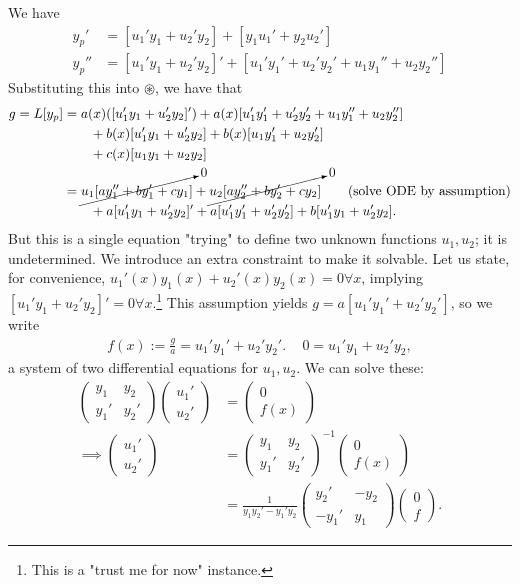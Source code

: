 We have
\begin{align*}
    y_p' &= [u_1'y_1+u_2'y_2]+[y_1u_1'+y_2u_2']\\
    y_p''&=[u_1'y_1+u_2'y_2]'+[u_1'y_1'+u_2'y_2'+u_1y_1''+u_2y_2'']
\end{align*}
Substituting this into $\circledast$, we have that \begin{align*}
    g = L[y_p] &= a(x)([u_1'y_1+u_2'y_2]')+a(x)[u_1'y_1'+u_2'y_2'+u_1y_1''+u_2y_2'']\\
    & \qquad + b(x)[u_1'y_1+u_2'y_2]+b(x)[u_1y_1'+u_2y_2']\\
    & \qquad + c(x)[u_1y_1+u_2y_2]\\
    &=\cancelto{0}{u_1[ay_1''+by_1'+cy_1]}+\cancelto{0}{u_2[ay_2''+by_2'+cy_2]} \qquad \text{(solve ODE by assumption)}\\
    & \qquad +a[u_1'y_1+u_2'y_2]'+a[u_1'y_1'+u_2'y_2']+b[u_1'y_1+u_2'y_2]. 
\end{align*}
But this is a single equation "trying" to define two unknown functions $u_1, u_2$; it is undetermined. We introduce an extra constraint to make it solvable. Let us state, for convenience, $u_1'(x)y_1(x)+u_2'(x)y_2(x)= 0 \forall x$, implying $[u_1'y_1+u_2'y_2]' = 0 \forall x$.\footnote{This is a "trust me for now" instance.}
This assumption yields $g = a[u_1'y_1'+u_2'y_2']$, so we write
\begin{align*}
   \boxed{f(x):=\frac{g}{a} = u_1'y_1'+u_2'y_2'.\, \quad 0 = u_1'y_1 + u_2'y_2,}
\end{align*}
a system of two differential equations for $u_1, u_2$. We can solve these:
\begin{align*}
    \begin{pmatrix}
        y_1 & y_2\\
        y_1' & y_2'
    \end{pmatrix}\begin{pmatrix}
        u_1'\\
        u_2'
    \end{pmatrix} &= \begin{pmatrix}
        0\\
        f(x)
    \end{pmatrix}\\
    \implies \begin{pmatrix}
        u_1'\\
        u_2'
    \end{pmatrix} &= \begin{pmatrix}
        y_1 & y_2\\
        y_1' & y_2'
    \end{pmatrix}^{-1} \begin{pmatrix}
        0\\
        f(x)
    \end{pmatrix}\\
    &= \frac{1}{y_1y_2'-y_1'y_2} \begin{pmatrix}
        y_2' & - y_2\\
        -y_1' & y_1
    \end{pmatrix} \begin{pmatrix}
        0\\
        f
    \end{pmatrix}.
\end{align*}
